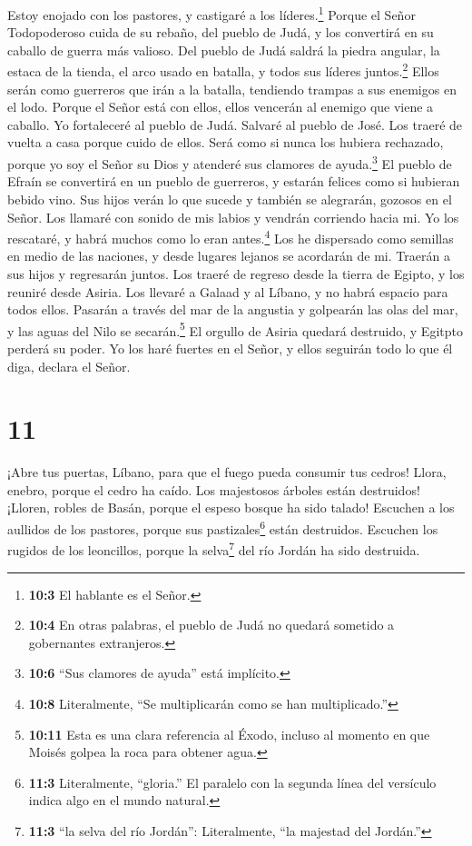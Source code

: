  Estoy enojado con los pastores, y castigaré a los
líderes.\footnote{\textbf{10:3} El hablante es el Señor.} Porque el
Señor Todopoderoso cuida de su rebaño, del pueblo de Judá, y los
convertirá en su caballo de guerra más valioso.  Del pueblo
de Judá saldrá la piedra angular, la estaca de la tienda, el arco usado
en batalla, y todos sus líderes juntos.\footnote{\textbf{10:4} En otras
  palabras, el pueblo de Judá no quedará sometido a gobernantes
  extranjeros.}  Ellos serán como guerreros que irán a la
batalla, tendiendo trampas a sus enemigos en el lodo. Porque el Señor
está con ellos, ellos vencerán al enemigo que viene a caballo.
 Yo fortaleceré al pueblo de Judá. Salvaré al pueblo de
José. Los traeré de vuelta a casa porque cuido de ellos. Será como si
nunca los hubiera rechazado, porque yo soy el Señor su Dios y atenderé
sus clamores de ayuda.\footnote{\textbf{10:6} ``Sus clamores de ayuda''
  está implícito.}  El pueblo de Efraín se convertirá en un
pueblo de guerreros, y estarán felices como si hubieran bebido vino. Sus
hijos verán lo que sucede y también se alegrarán, gozosos en el Señor.
 Los llamaré con sonido de mis labios y vendrán corriendo
hacia mi. Yo los rescataré, y habrá muchos como lo eran
antes.\footnote{\textbf{10:8} Literalmente, ``Se multiplicarán como se
  han multiplicado.''}  Los he dispersado como semillas en
medio de las naciones, y desde lugares lejanos se acordarán de mi.
Traerán a sus hijos y regresarán juntos.  Los traeré de
regreso desde la tierra de Egipto, y los reuniré desde Asiria. Los
llevaré a Galaad y al Líbano, y no habrá espacio para todos ellos.
 Pasarán a través del mar de la angustia y golpearán las
olas del mar, y las aguas del Nilo se secarán.\footnote{\textbf{10:11}
  Esta es una clara referencia al Éxodo, incluso al momento en que
  Moisés golpea la roca para obtener agua.} El orgullo de Asiria quedará
destruido, y Egitpto perderá su poder.  Yo los haré fuertes
en el Señor, y ellos seguirán todo lo que él diga, declara el Señor.

\hypertarget{section-10}{%
\section{11}\label{section-10}}

 ¡Abre tus puertas, Líbano, para que el fuego pueda consumir
tus cedros!  Llora, enebro, porque el cedro ha caído. Los
majestosos árboles están destruidos! ¡Lloren, robles de Basán, porque el
espeso bosque ha sido talado!  Escuchen a los aullidos de
los pastores, porque sus pastizales\footnote{\textbf{11:3} Literalmente,
  ``gloria.'' El paralelo con la segunda línea del versículo indica algo
  en el mundo natural.} están destruidos. Escuchen los rugidos de los
leoncillos, porque la selva\footnote{\textbf{11:3} ``la selva del río
  Jordán'': Literalmente, ``la majestad del Jordán.''} del río Jordán ha
sido destruida.

